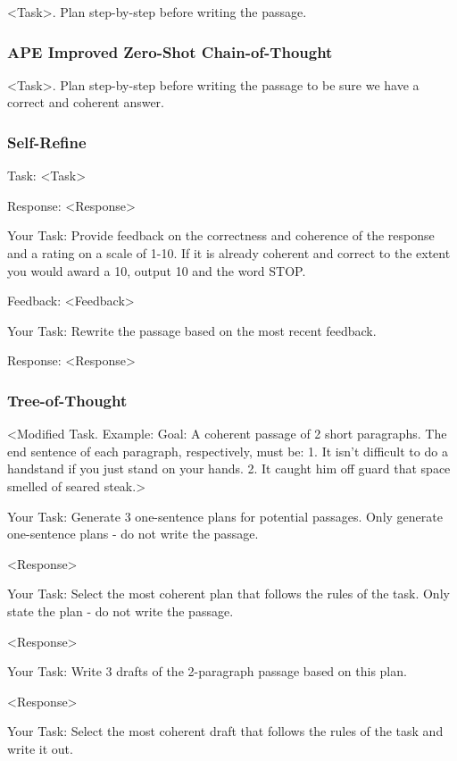 \documentclass[11pt]{article}
\begin{document}
<Task>. Plan step-by-step before writing the passage.

\subsubsection*{APE Improved Zero-Shot Chain-of-Thought}

<Task>. Plan step-by-step before writing the passage to be sure we have a correct and coherent answer.

\subsubsection*{Self-Refine}

Task: <Task>

Response: <Response>

Your Task: Provide feedback on the correctness and coherence of the response and a rating on a scale of 1-10. If it is already coherent and correct to the extent you would award a 10, output 10 and the word STOP.

Feedback: <Feedback>

Your Task: Rewrite the passage based on the most recent feedback.

Response: <Response>

\subsubsection*{Tree-of-Thought}

<Modified Task. Example: Goal: A coherent passage of 2 short paragraphs. The end sentence of each paragraph, respectively, must be: 1. It isn't difficult to do a handstand if you just stand on your hands. 2. It caught him off guard that space smelled of seared steak.>

Your Task: Generate 3 one-sentence plans for potential passages. Only generate one-sentence plans - do not write the passage.

<Response>

Your Task: Select the most coherent plan that follows the rules of the task. Only state the plan - do not write the passage.

<Response>

Your Task: Write 3 drafts of the 2-paragraph passage based on this plan.

<Response>

Your Task: Select the most coherent draft that follows the rules of the task and write it out.
\end{document}
